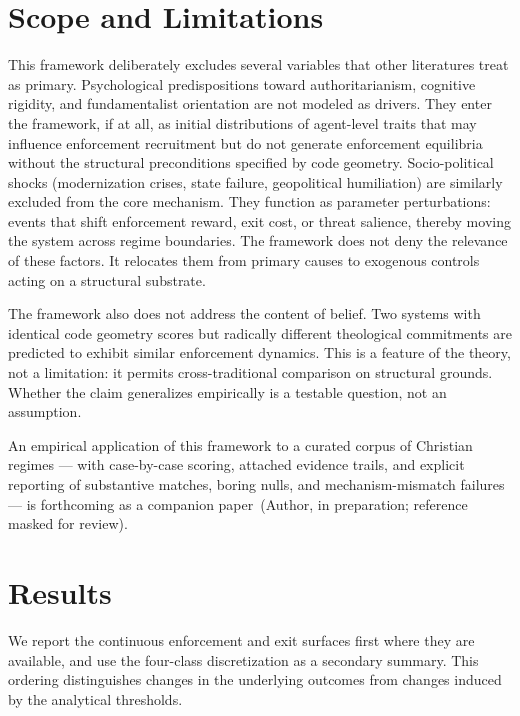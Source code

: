 \documentclass[12pt]{article}
\begin{document}
\section{Scope and Limitations}

This framework deliberately excludes several variables that other literatures treat as primary. Psychological predispositions toward authoritarianism, cognitive rigidity, and fundamentalist orientation are not modeled as drivers. They enter the framework, if at all, as initial distributions of agent-level traits that may influence enforcement recruitment but do not generate enforcement equilibria without the structural preconditions specified by code geometry. Socio-political shocks (modernization crises, state failure, geopolitical humiliation) are similarly excluded from the core mechanism. They function as parameter perturbations: events that shift enforcement reward, exit cost, or threat salience, thereby moving the system across regime boundaries. The framework does not deny the relevance of these factors. It relocates them from primary causes to exogenous controls acting on a structural substrate.

The framework also does not address the content of belief. Two systems with identical code geometry scores but radically different theological commitments are predicted to exhibit similar enforcement dynamics. This is a feature of the theory, not a limitation: it permits cross-traditional comparison on structural grounds. Whether the claim generalizes empirically is a testable question, not an assumption.

An empirical application of this framework to a curated corpus of Christian regimes --- with case-by-case scoring, attached evidence trails, and explicit reporting of substantive matches, boring nulls, and mechanism-mismatch failures --- is forthcoming as a companion paper~(Author, in preparation; reference masked for review).



\section{Results}

We report the continuous enforcement and exit surfaces first where they are available, and use the four-class discretization as a secondary summary. This ordering distinguishes changes in the underlying outcomes from changes induced by the analytical thresholds.
\end{document}
